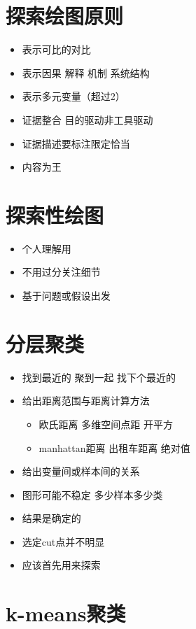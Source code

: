 \documentclass[]{book}
\providecommand{\tightlist}{%
  \setlength{\itemsep}{0pt}\setlength{\parskip}{0pt}}
\begin{document}
\section{探索绘图原则}

\begin{itemize}
\tightlist
\item
  表示可比的对比
\item
  表示因果 解释 机制 系统结构
\item
  表示多元变量（超过2）
\item
  证据整合 目的驱动非工具驱动
\item
  证据描述要标注限定恰当
\item
  内容为王
\end{itemize}

\section{探索性绘图}

\begin{itemize}
\tightlist
\item
  个人理解用
\item
  不用过分关注细节
\item
  基于问题或假设出发
\end{itemize}

\section{分层聚类}

\begin{itemize}
\tightlist
\item
  找到最近的 聚到一起 找下个最近的
\item
  给出距离范围与距离计算方法

  \begin{itemize}
  \tightlist
  \item
    欧氏距离 多维空间点距 开平方
  \item
    manhattan距离 出租车距离 绝对值
  \end{itemize}
\item
  给出变量间或样本间的关系
\item
  图形可能不稳定 多少样本多少类
\item
  结果是确定的
\item
  选定cut点并不明显
\item
  应该首先用来探索
\end{itemize}

\hypertarget{k-means}{%
\section{k-means聚类}\label{k-means}}
\end{document}
